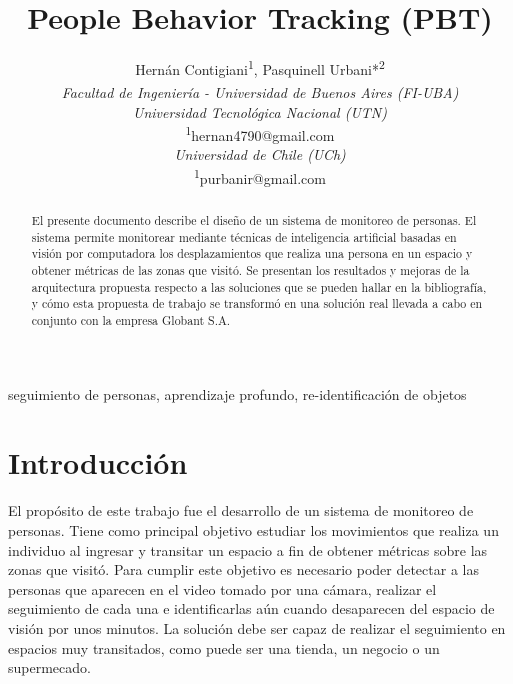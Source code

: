 \documentclass[conference]{IEEEtran}
\begin{document}
\title{People Behavior Tracking (PBT)\\}

\author{
Hernán Contigiani\textsuperscript{\dag}\textsuperscript{1}, Pasquinell Urbani*\textsuperscript{2} \\
\textsuperscript{\dag}\textit{Facultad de Ingeniería - Universidad de Buenos Aires (FI-UBA)} \\
\textit{Universidad Tecnológica Nacional (UTN)} \\
\textsuperscript{1}\small hernan4790@gmail.com \\
\normalsize *\textit{Universidad de Chile (UCh)} \\
\textsuperscript{1}\small purbanir@gmail.com
}
\maketitle

\begin{abstract}
El presente documento describe el diseño de un sistema de monitoreo de personas. El sistema permite monitorear mediante técnicas de inteligencia artificial basadas en visión por computadora los desplazamientos que realiza una persona en un espacio y obtener métricas de las zonas que visitó. Se presentan los resultados y mejoras de la arquitectura propuesta respecto a las soluciones que se pueden hallar en la bibliografía, y cómo esta propuesta de trabajo se transformó en una solución real llevada a cabo en conjunto con la empresa Globant S.A.
\end{abstract}

\begin{IEEEkeywords}
seguimiento de personas, aprendizaje profundo, re-identificación de objetos
\end{IEEEkeywords}

\section{Introducción}
El propósito de este trabajo fue el desarrollo de un sistema de monitoreo de personas. Tiene como principal objetivo estudiar los movimientos que realiza un individuo al ingresar y transitar un espacio a fin de obtener métricas sobre las zonas que visitó. Para cumplir este objetivo es necesario poder detectar a las personas que aparecen en el video tomado por una cámara, realizar el seguimiento de cada una e identificarlas aún cuando desaparecen del espacio de visión por unos minutos. La solución debe ser capaz de realizar el seguimiento en espacios muy transitados, como puede ser una tienda, un negocio o un supermecado.
\end{document}
